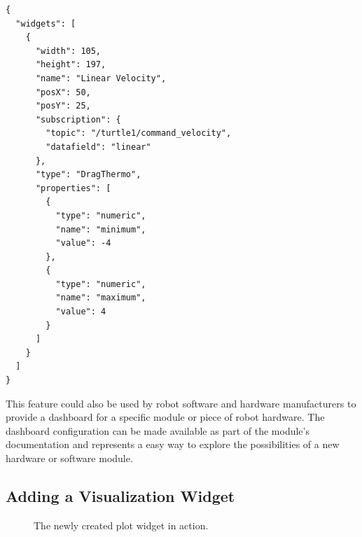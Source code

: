 \begin{lstlisting}[frame=single,caption={Example dashboard configuration in JSON.},label=json_example]
{
  "widgets": [
    {
      "width": 105,
      "height": 197,
      "name": "Linear Velocity",
      "posX": 50,
      "posY": 25,
      "subscription": {
        "topic": "/turtle1/command_velocity",
        "datafield": "linear"
      },
      "type": "DragThermo",
      "properties": [
        {
          "type": "numeric",
          "name": "minimum",
          "value": -4
        },
        {
          "type": "numeric",
          "name": "maximum",
          "value": 4
        }
      ]
    }
  ]
}
\end{lstlisting}

This feature could also be used by robot software and hardware manufacturers to provide a dashboard for a specific module or piece of robot hardware. The dashboard configuration can be made available as part of the module's documentation and represents a easy way to explore the possibilities of a new hardware or software module.

\subsection{Adding a Visualization Widget}
\label{plot_widget_section}


\begin{figure}[htb]
  \centering
  \caption{The newly created plot widget in action.}
  \label{plot_widget}
\end{figure}

